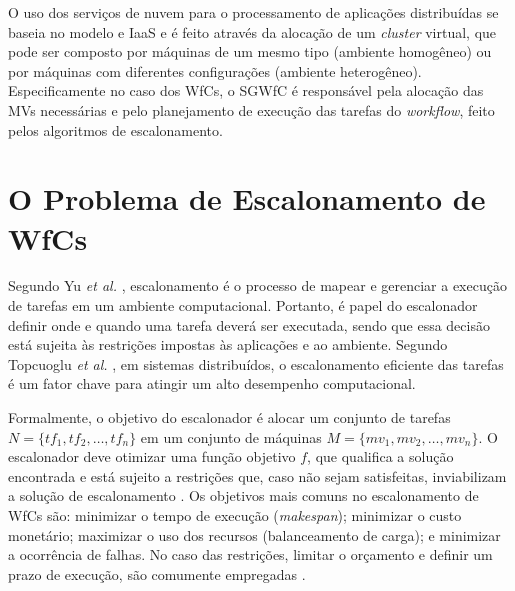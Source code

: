 O uso dos serviços de nuvem para o processamento de aplicações distribuídas se baseia no modelo e IaaS e é feito através da alocação de um \textit{cluster} virtual, que pode ser composto por máquinas de um mesmo tipo (ambiente homogêneo) ou por máquinas com diferentes configurações (ambiente heterogêneo). Especificamente no caso dos WfCs, o SGWfC é responsável pela alocação das MVs necessárias e pelo planejamento de execução das tarefas do \textit{workflow}, feito pelos algoritmos de escalonamento.

                                                                          
\section{O Problema de Escalonamento de WfCs}\label{sec2:sp}

Segundo Yu \textit{et al.} \cite{Yu2008}, escalonamento é o processo de mapear e gerenciar a execução de tarefas em um ambiente computacional. Portanto, é papel do escalonador definir onde e quando  uma tarefa deverá ser executada, sendo que essa decisão está sujeita às restrições impostas às aplicações e ao ambiente. Segundo Topcuoglu \textit{et al.} \cite{HEFT}, em sistemas distribuídos, o escalonamento eficiente das tarefas é um fator chave para atingir um alto desempenho computacional.

Formalmente, o objetivo do escalonador é alocar um conjunto de tarefas $N = \{tf_1,\allowbreak tf_2,\allowbreak\dots,tf_n\}$ em um conjunto de máquinas $M = \{mv_1, mv_2, \dots, mv_n\}$. O escalonador deve otimizar uma função objetivo $f$, que qualifica a solução encontrada e está sujeito a restrições que, caso não sejam satisfeitas, inviabilizam a solução de escalonamento \cite{tsai14}. Os objetivos mais comuns no escalonamento de WfCs são: minimizar o tempo de execução (\textit{makespan}); minimizar o custo monetário; maximizar o uso dos recursos (balanceamento de carga); e minimizar a ocorrência de falhas. No caso das restrições, limitar o orçamento e definir um prazo de execução, são comumente empregadas \cite{Masdari16}. 

